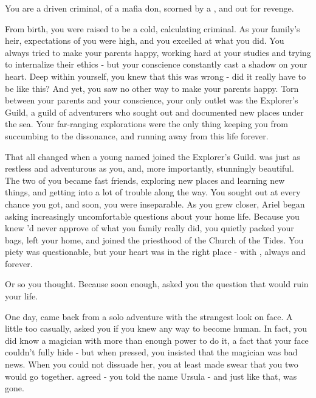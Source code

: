 \documentclass[char]{NeptuneBall}
\begin{document}
\name{\cPriest{}}



You are a driven criminal, \cPriest{\offspring} of a mafia don, scorned by a \cAriel{\Prince}, and out for revenge.

From birth, you were raised to be a cold, calculating criminal. As your family's heir, expectations of you were high, and you excelled at what you did. You always tried to make your parents happy, working hard at your studies and trying to internalize their ethics - but your conscience constantly cast a shadow on your heart. Deep within yourself, you knew that this was wrong - did it really have to be like this? And yet, you saw no other way to make your parents happy. Torn between your parents and your conscience, your only outlet was the Explorer's Guild, a guild of adventurers who sought out and documented new places under the sea. Your far-ranging explorations were the only thing keeping you from succumbing to the dissonance, and running away from this life forever.

That all changed when a young \cAriel{\Prince} named \cAriel{} joined the Explorer's Guild. \cAriel{\they} was just as restless and adventurous as you, and, more importantly, stunningly beautiful. The two of you became fast friends, exploring new places and learning new things, and getting into a lot of trouble along the way. You sought \cAriel{\them} out at every chance you got, and soon, you were inseparable. As you grew closer, Ariel began asking increasingly uncomfortable questions about your home life. Because you knew \cAriel{\they}'d never approve of what you family really did, you quietly packed your bags, left your home, and joined the priesthood of the Church of the Tides. You piety was questionable, but your heart was in the right place - with \cAriel{}, always and forever.

Or so you thought. Because soon enough, \cAriel{} asked you the question that would ruin your life. 

One day, \cAriel{} came back from a solo adventure with the strangest look on \cAriel{\their} face. A little too casually, \cAriel{\they} asked you if you knew any way to become human. In fact, you did know a magician with more than enough power to do it, a fact that your face couldn't fully hide - but when \cAriel{\they} pressed, you insisted that the magician was bad news. When you could not dissuade her, you at least made \cAriel{\them} swear that you two would go together. \cAriel{\they} agreed - you told \cAriel{\them} the name Ursula - and just like that, \cAriel{\they} was gone. 
\end{document}
